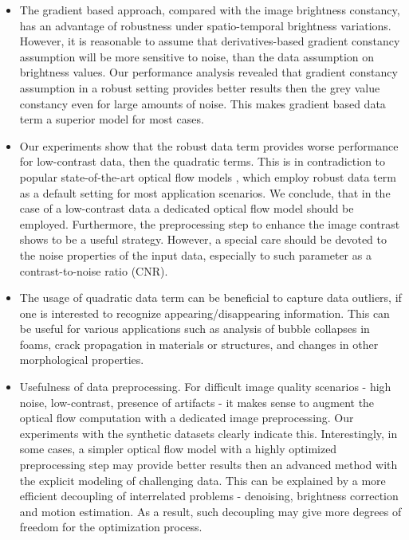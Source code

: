 \begin{itemize}

\item The gradient based approach, compared with the image brightness constancy, has an advantage of robustness under spatio-temporal brightness variations. However, it is reasonable to assume that derivatives-based gradient constancy assumption will be more sensitive to noise, than the data assumption on brightness values. Our performance analysis revealed that  gradient constancy assumption in a robust setting provides better results then the grey value constancy  even for large amounts of noise. This makes gradient based data term a superior model for most cases.

\item Our experiments show that the robust data term provides worse performance for low-contrast data, then the quadratic terms. This is in contradiction to popular state-of-the-art optical flow models \cite{Middl}, which employ robust data term as a default setting for most application scenarios. We conclude, that in the case of a low-contrast data a dedicated optical flow model should be employed. Furthermore, the preprocessing step to enhance the image contrast shows to be a useful strategy. However, a special care should be devoted to the noise properties of the input data, especially to such parameter as a contrast-to-noise ratio (CNR).

\item The usage of quadratic data term can be beneficial to capture data outliers, if one is interested to recognize appearing/disappearing information. This can be useful for various applications such as analysis of bubble collapses in foams, crack propagation in materials or structures, and changes in other morphological properties.

\item  Usefulness of data preprocessing. For difficult image quality scenarios - high noise, low-contrast, presence of artifacts - it makes sense to augment the optical flow computation with a dedicated image preprocessing. Our experiments with the synthetic datasets clearly indicate this. Interestingly, in some cases, a simpler optical flow model with a highly optimized preprocessing step may provide better results then an advanced method with the explicit modeling of challenging data. This can be explained by a more efficient decoupling of interrelated problems - denoising, brightness correction and motion estimation. As a result, such decoupling may give more degrees of freedom for the optimization process. 

\end{itemize}

